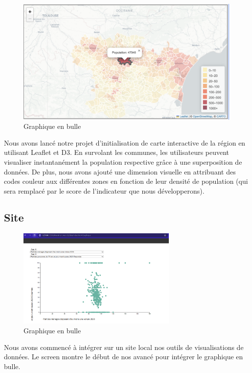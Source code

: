 \documentclass{article}
\begin{document}
\begin{figure}[h]
    \centering
    \includegraphics[width=1\textwidth]{carte.png}
    \caption{Graphique en bulle}
    \label{fig:kaggle}
\end{figure}

Nous avons lancé notre projet d'initialisation de carte interactive de la région en utilisant Leaflet et D3. En survolant les communes, les utilisateurs peuvent visualiser instantanément la population respective grâce à une superposition de données. De plus, nous avons ajouté une dimension visuelle en attribuant des codes couleur aux différentes zones en fonction de leur densité de population (qui sera remplacé par le score de l'indicateur que nous développerons).

\subsection{Site}

\begin{figure}[h]
    \centering
    \includegraphics[width=0.7\textwidth]{site.png}
    \caption{Graphique en bulle}
    \label{fig:kaggle}
\end{figure}

Nous avons commencé à intégrer sur un site local nos outils de visualisations de données. Le screen montre le début de nos avancé pour intégrer le graphique en bulle.
\end{document}
